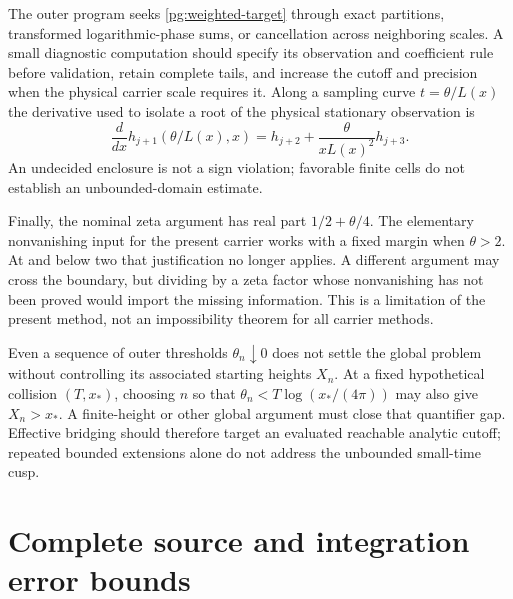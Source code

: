 \documentclass[11pt]{article}
\numberwithin{equation}{section}
\theoremstyle{definition}
\theoremstyle{remark}
\begin{document}
The outer program seeks \eqref{pg:weighted-target} through exact
partitions, transformed logarithmic-phase sums, or cancellation across
neighboring scales.  A small diagnostic computation should specify
its observation and coefficient rule before validation, retain complete
tails, and increase the cutoff and precision when the physical carrier
scale requires it.  Along a sampling curve $t=\theta/L(x)$ the derivative
used to isolate a root of the physical stationary observation is
\[
 \frac d{dx}h_{j+1}(\theta/L(x),x)
   =h_{j+2}+\frac{\theta}{xL(x)^2}h_{j+3}.
\]
An undecided enclosure is not a sign violation; favorable finite cells
do not establish an unbounded-domain estimate.

Finally, the nominal zeta argument has real part $1/2+\theta/4$.
The elementary nonvanishing input for the present carrier works with
a fixed margin when $\theta>2$.  At and below two that justification
no longer applies.  A different argument may cross the boundary, but
dividing by a zeta factor whose nonvanishing has not been proved would
import the missing information.  This is a limitation of the present
method, not an impossibility theorem for all carrier methods.

Even a sequence of outer thresholds $\theta_n\downarrow0$ does not
settle the global problem without controlling its associated starting
heights $X_n$.  At a fixed hypothetical collision $(T,x_*)$, choosing
$n$ so that $\theta_n<T\log(x_*/(4\pi))$ may also give $X_n>x_*$.
A finite-height or other global argument must close that quantifier
gap.  Effective bridging should therefore target an evaluated reachable
analytic cutoff; repeated bounded extensions alone do not address the
unbounded small-time cusp.

\appendix
\section{Complete source and integration error bounds}\label{app:payments}
\end{document}
